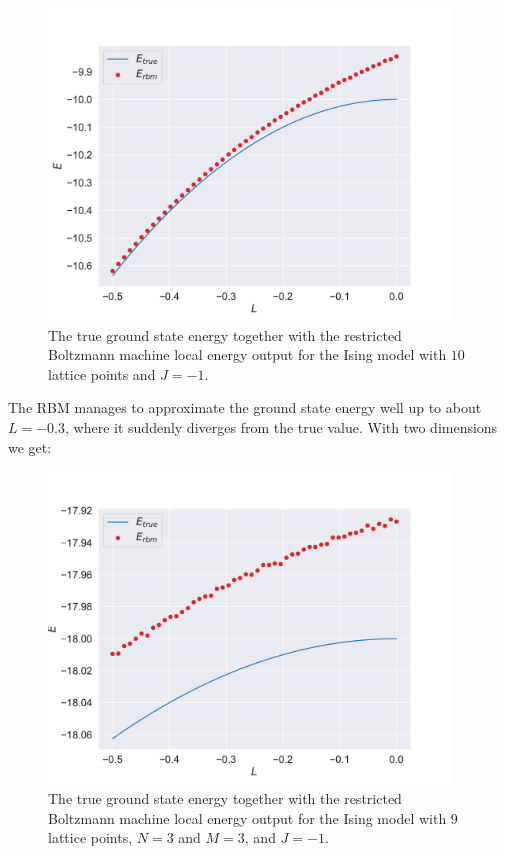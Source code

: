 \begin{figure}[H]
  \begin{center}
    \includegraphics[width=0.95\textwidth]{Figures/Plots/Ising/val-true[L][-0.5-0.0][e=500][n=10][J=-1]}
  \end{center}
  \caption{The true ground state energy together with the restricted Boltzmann machine local energy output for the Ising model with $10$ lattice points and $J=-1$.}
\end{figure}

The RBM manages to approximate the ground state energy well up to about $L = -0.3$, where it suddenly diverges from the true value. With two dimensions we get:

\begin{figure}[H]
  \begin{center}
    \includegraphics[width=0.95\textwidth]{Figures/Plots/Ising/val-true[L][-0.5-0.0][e=500][n=9][J=-1]}
  \end{center}
  \caption{The true ground state energy together with the restricted Boltzmann machine local energy output for the Ising model with $9$ lattice points, $N=3$ and $M=3$, and $J=-1$.}
\end{figure}

